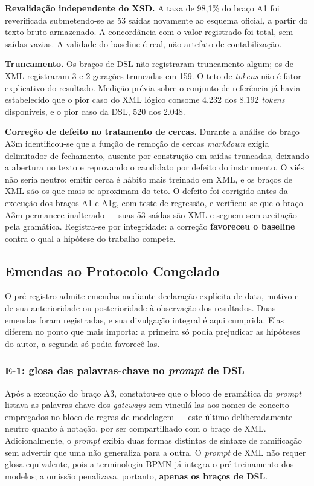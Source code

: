 \textbf{Revalidação independente do XSD.} A taxa de 98,1\% do braço A1 foi reverificada submetendo-se as 53 saídas novamente ao esquema oficial, a partir do texto bruto armazenado. A concordância com o valor registrado foi total, sem saídas vazias. A validade do baseline é real, não artefato de contabilização.

\textbf{Truncamento.} Os braços de DSL não registraram truncamento algum; os de XML registraram 3 e 2 gerações truncadas em 159. O teto de \textit{tokens} não é fator explicativo do resultado. Medição prévia sobre o conjunto de referência já havia estabelecido que o pior caso do XML lógico consome 4.232 dos 8.192 \textit{tokens} disponíveis, e o pior caso da DSL, 520 dos 2.048.

\textbf{Correção de defeito no tratamento de cercas.} Durante a análise do braço A3m identificou-se que a função de remoção de cercas \textit{markdown} exigia delimitador de fechamento, ausente por construção em saídas truncadas, deixando a abertura no texto e reprovando o candidato por defeito do instrumento. O viés não seria neutro: emitir cerca é hábito mais treinado em XML, e os braços de XML são os que mais se aproximam do teto. O defeito foi corrigido antes da execução dos braços A1 e A1g, com teste de regressão, e verificou-se que o braço A3m permanece inalterado — suas 53 saídas são XML e seguem sem aceitação pela gramática. Registra-se por integridade: a correção \textbf{favoreceu o baseline} contra o qual a hipótese do trabalho compete.

\subsection{Emendas ao Protocolo Congelado}
\label{subsec:res-emenda}

O pré-registro admite emendas mediante declaração explícita de data, motivo e de sua anterioridade ou posterioridade à observação dos resultados. Duas emendas foram registradas, e sua divulgação integral é aqui cumprida. Elas diferem no ponto que mais importa: a primeira só podia prejudicar as hipóteses do autor, a segunda só podia favorecê-las.

\subsubsection*{E-1: glosa das palavras-chave no \textit{prompt} de DSL}

Após a execução do braço A3, constatou-se que o bloco de gramática do \textit{prompt} listava as palavras-chave dos \textit{gateways} sem vinculá-las aos nomes de conceito empregados no bloco de regras de modelagem — este último deliberadamente neutro quanto à notação, por ser compartilhado com o braço de XML. Adicionalmente, o \textit{prompt} exibia duas formas distintas de sintaxe de ramificação sem advertir que uma não generaliza para a outra. O \textit{prompt} de XML não requer glosa equivalente, pois a terminologia BPMN já integra o pré-treinamento dos modelos; a omissão penalizava, portanto, \textbf{apenas os braços de DSL}.

